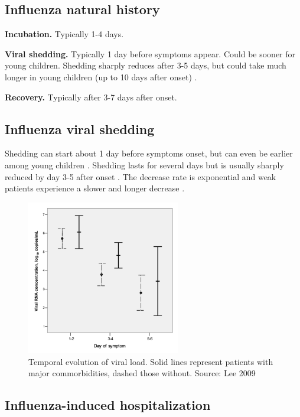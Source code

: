 \documentclass[11pt, onecolumn]{article}
\begin{document}
\subsection{Influenza natural history}

\textbf{Incubation.} Typically 1-4 days.

\textbf{Viral shedding.} Typically 1 day before symptoms appear. Could be sooner for young children. Shedding sharply reduces after 3-5 days, but could take much longer in young children (up to 10 days after onset) \cite{Carrat:2008bk}. 

\textbf{Recovery.} Typically after 3-7 days after onset.


\subsection{Influenza viral shedding}

Shedding can start about 1 day before symptoms onset, but can even be earlier among young children \cite{CDC:2011wq}. Shedding lasts for several days but is usually sharply reduced by day 3-5 after onset \cite{CDC:2011wq}. The decrease rate is exponential and weak patients experience a slower and longer decrease \cite{Lee:2009dc}.

\begin{figure}[!ht]
\centering
    \includegraphics[angle=0,width=0.6\textwidth]{figures/VL_Lee.png}
\caption{Temporal evolution of viral load. Solid lines represent patients with major commorbidities, dashed those without. Source: Lee 2009 \cite{Lee:2009dc}}
\label{fig:VL_Lee}
\end{figure}


\subsection{Influenza-induced hospitalization}
\end{document}
